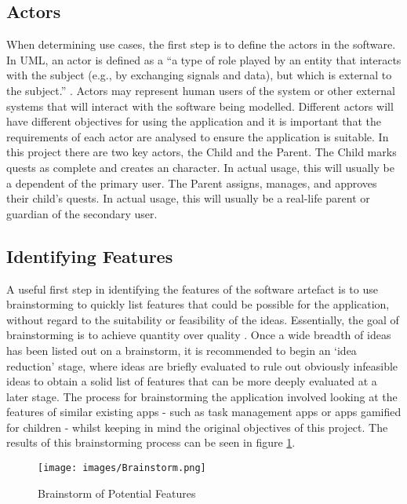 \subsection{Actors}
When determining use cases, the first step is to define the actors in the software.
In UML, an actor is defined as a ``a type of role played by an entity that interacts with the subject (e.g., by exchanging signals and data), but which is external to the subject.'' \citep[p.586]{omg2007unified}.
Actors may represent human users of the system or other external systems that will interact with the software being modelled.
Different actors will have different objectives for using the application and it is important that the requirements of each actor are analysed to ensure the application is suitable. 
In this project there are two key actors, the Child and the Parent. 
The Child marks quests as complete and creates an character. In actual usage, this will usually be a dependent of the primary user. 
The Parent assigns, manages, and approves their child's quests. In actual usage, this will usually be a real-life parent or guardian of the secondary user.

\subsection{Identifying Features}
A useful first step in identifying the features of the software artefact is to use brainstorming to quickly list features that could be possible for the application, without regard to the suitability or feasibility of the ideas.
Essentially, the goal of brainstorming is to achieve quantity over quality \citep[p.144]{leffingwell2000managing}.
Once a wide breadth of ideas has been listed out on a brainstorm, it is recommended to begin an `idea reduction' stage, where ideas are briefly evaluated to rule out obviously infeasible ideas to obtain a solid list of features that can be more deeply evaluated at a later stage.
The process for brainstorming the application involved looking at the features of similar existing apps - such as task management apps or apps gamified for children - whilst keeping in mind the original objectives of this project.
The results of this brainstorming process can be seen in figure \ref{fig:brainstorm}.

\begin{figure}[ht]
	\centering
	\texttt{[image: images/Brainstorm.png]}
	\caption{Brainstorm of Potential Features}
	\label{fig:brainstorm}
\end{figure} 

